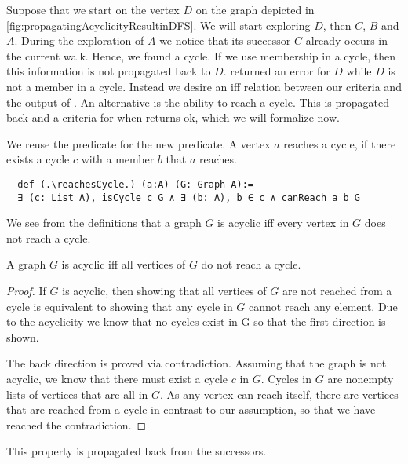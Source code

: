 \begin{example}
  \label{ex:propagatingAcyclicityResultinDFS}
  

  Suppose that we start \dfsstep on the vertex $D$ on the graph depicted in \cref{fig:propagatingAcyclicityResultinDFS}. We will start exploring $D$, then $C$, $B$ and $A$. During the exploration of $A$ we notice that its successor $C$ already occurs in the current walk. Hence, we found a cycle. If we use membership in a cycle, then this information is not propagated back to $D$. \dfsstep returned an error for $D$ while $D$ is not a member in a cycle. Instead we desire an iff relation between our criteria and the output of \dfsstep. An alternative is the ability to reach a cycle. This is propagated back and a criteria for when \dfsstep returns ok, which we will formalize now.
\end{example}

We reuse the \canReach predicate for the new \reachesCycle predicate. A vertex $a$ reaches a cycle, if there exists a cycle $c$ with a member $b$ that $a$ reaches.

\begin{lstlisting}
  def (.\reachesCycle.) (a:A) (G: Graph A):= 
  ∃ (c: List A), isCycle c G ∧ ∃ (b: A), b ∈ c ∧ canReach a b G
\end{lstlisting}

We see from the definitions that a graph $G$ is acyclic iff every vertex in $G$ does not reach a cycle. 


\begin{lemma}[\acyclicIffAllNotReachCycle]\label{lem:acyclicIffAllNotReachCycle}
  A graph $G$ is acyclic iff all vertices of $G$ do not reach a cycle.
\end{lemma}
\begin{proof}
  If $G$ is acyclic, then showing that all vertices of $G$ are not reached from a cycle is equivalent to showing that any cycle in $G$ cannot reach any element. Due to the acyclicity we know that no cycles exist in G so that the first direction is shown.

  The back direction is proved via contradiction. Assuming that the graph is not acyclic, we know that there must exist a cycle $c$ in $G$. Cycles in $G$ are nonempty lists of vertices that are all in $G$. As any vertex can reach itself, there are vertices that are reached from a cycle in contrast to our assumption, so that we have reached the contradiction.
\end{proof}

This property is propagated back from the successors.

